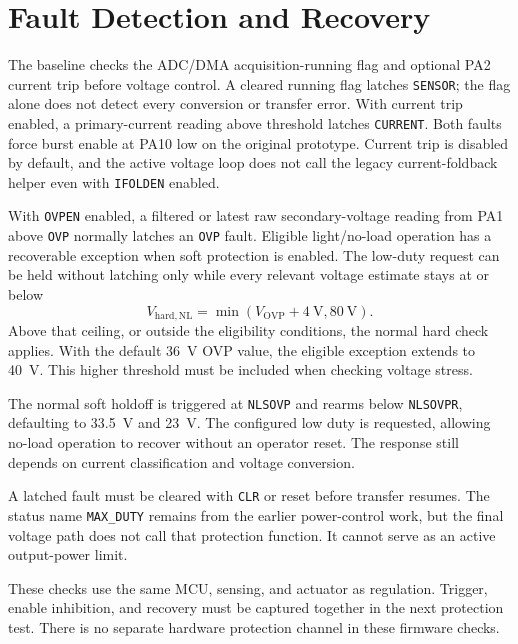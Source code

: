 \section{Fault Detection and Recovery}
\label{sec:ctrl-faults}

The baseline checks the ADC/DMA acquisition-running flag and optional PA2 current trip before voltage control. A cleared running flag latches \texttt{SENSOR}; the flag alone does not detect every conversion or transfer error. With current trip enabled, a primary-current reading above threshold latches \texttt{CURRENT}. Both faults force burst enable at PA10 low on the original prototype. Current trip is disabled by default, and the active voltage loop does not call the legacy current-foldback helper even with \texttt{IFOLDEN} enabled.

With \texttt{OVPEN} enabled, a filtered or latest raw secondary-voltage reading from PA1 above \texttt{OVP} normally latches an \texttt{OVP} fault. Eligible light/no-load operation has a recoverable exception when soft protection is enabled. The low-duty request can be held without latching only while every relevant voltage estimate stays at or below
\begin{equation}
 V_{\mathrm{hard,NL}}=
 \min\!\left(V_{\mathrm{OVP}}+\SI{4}{\volt},\SI{80}{\volt}\right).
 \label{eq:ctrl-no-load-hard-limit}
\end{equation}
Above that ceiling, or outside the eligibility conditions, the normal hard check applies. With the default \SI{36}{\volt} OVP value, the eligible exception extends to \SI{40}{\volt}. This higher threshold must be included when checking voltage stress.

The normal soft holdoff is triggered at \texttt{NLSOVP} and rearms below \texttt{NLSOVPR}, defaulting to \SI{33.5}{\volt} and \SI{23}{\volt}. The configured low duty is requested, allowing no-load operation to recover without an operator reset. The response still depends on current classification and voltage conversion.

A latched fault must be cleared with \texttt{CLR} or reset before transfer resumes. The status name \texttt{MAX\_DUTY} remains from the earlier power-control work, but the final voltage path does not call that protection function. It cannot serve as an active output-power limit.

These checks use the same MCU, sensing, and actuator as regulation. Trigger, enable inhibition, and recovery must be captured together in the next protection test. There is no separate hardware protection channel in these firmware checks.
